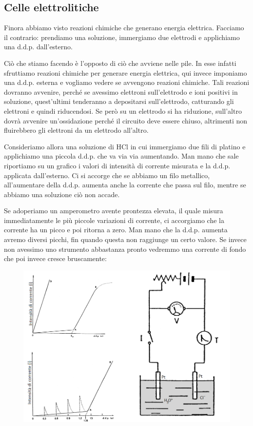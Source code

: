 \subsection{Celle elettrolitiche}
Finora abbiamo visto reazioni chimiche che generano energia elettrica. Facciamo il contrario: prendiamo una soluzione, immergiamo due elettrodi e applichiamo una d.d.p. dall'esterno.

Ciò che stiamo facendo è l'opposto di ciò che avviene nelle pile. In esse infatti sfruttiamo reazioni chimiche per generare energia elettrica, qui invece imponiamo una d.d.p. esterna e vogliamo vedere se avvengono reazioni chimiche. Tali reazioni dovranno avvenire, perché se avessimo elettroni sull'elettrodo e ioni positivi in soluzione, quest'ultimi tenderanno a depositarsi sull'elettrodo, catturando gli elettroni e quindi riducendosi. Se però su un elettrodo si ha riduzione, sull'altro dovrà avvenire un'ossidazione perché il circuito deve essere chiuso, altrimenti non fluirebbero gli elettroni da un elettrodo all'altro.

Consideriamo allora una soluzione di HCl in cui immergiamo due fili di platino e applichiamo una piccola d.d.p. che va via via aumentando. Man mano che sale riportiamo su un grafico i valori di intensità di corrente misurata e la d.d.p. applicata dall'esterno. Ci si accorge che se abbiamo un filo metallico, all'aumentare della d.d.p. aumenta anche la corrente che passa sul filo, mentre se abbiamo una soluzione ciò non accade.

Se adoperiamo un amperometro avente prontezza elevata, il quale misura immediatamente le più piccole variazioni di corrente, ci accorgiamo che la corrente ha un picco e poi ritorna a zero. Man mano che la d.d.p. aumenta avremo diversi picchi, fin quando questa non raggiunge un certo valore. Se invece non avessimo uno strumento abbastanza pronto vedremmo una corrente di fondo che poi invece cresce bruscamente:

\vspace{-0.5cm}\begin{figure}[H]
    \centering
    \includegraphics[width=14cm]{immagini/elettrolisi.png}
\end{figure}

